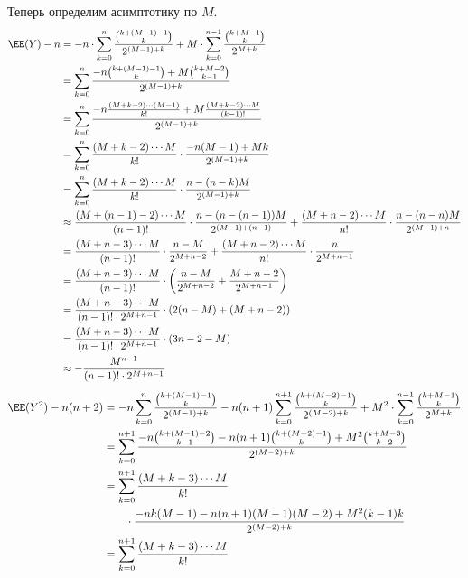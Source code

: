 \documentclass[12pt,a4paper]{article}
\begin{document}
\begin{enumproblem}
        Теперь определим асимптотику по $M$.
        \begin{align*}
            \EE(Y) - n
            &= -n \cdot \sum_{k=0}^{n} \frac{\binom{k+(M-1)-1}{k}}{2^{(M-1)+k}} + M \cdot \sum_{k=0}^{n-1} \frac{\binom{k+M-1}{k}}{2^{M+k}}\\
            &= \sum_{k=0}^{n} \frac{-n \binom{k+(M-1)-1}{k} + M \binom{k+M-2}{k-1}}{2^{(M-1)+k}}\\
            &= \sum_{k=0}^{n} \frac{-n \frac{(M+k-2) \cdots (M-1)}{k!} + M \frac{(M+k-2) \cdots M}{(k-1)!}}{2^{(M-1)+k}}\\
            &= \sum_{k=0}^{n} \frac{(M+k-2) \cdots M}{k!} \cdot \frac{-n(M-1) + M k}{2^{(M-1)+k}}\\
            &= \sum_{k=0}^{n} \frac{(M+k-2) \cdots M}{k!} \cdot \frac{n - (n-k)M}{2^{(M-1)+k}}\\
            &\approx \frac{(M+(n-1)-2) \cdots M}{(n-1)!} \cdot \frac{n - (n-(n-1))M}{2^{(M-1)+(n-1)}} + \frac{(M+n-2) \cdots M}{n!} \cdot \frac{n - (n-n)M}{2^{(M-1)+n}}\\
            &= \frac{(M+n-3) \cdots M}{(n-1)!} \cdot \frac{n - M}{2^{M+n-2}} + \frac{(M+n-2) \cdots M}{n!} \cdot \frac{n}{2^{M+n-1}}\\
            &= \frac{(M+n-3) \cdots M}{(n-1)!} \cdot \left(\frac{n - M}{2^{M+n-2}} + \frac{M+n-2}{2^{M+n-1}}\right)\\
            &= \frac{(M+n-3) \cdots M}{(n-1)! \cdot 2^{M+n-1}} \cdot \left(2(n - M) + (M+n-2)\right)\\
            &= \frac{(M+n-3) \cdots M}{(n-1)! \cdot 2^{M+n-1}} \cdot (3n - 2 - M)\\
            &\approx -\frac{M^{n-1}}{(n-1)! \cdot 2^{M+n-1}}
        \end{align*}
        \begin{align*}
            \EE(Y^2) - n(n+2)
            &= -n \sum_{k=0}^{n} \frac{\binom{k+(M-1)-1}{k}}{2^{(M-1)+k}} -n(n+1) \sum_{k=0}^{n+1} \frac{\binom{k+(M-2)-1}{k}}{2^{(M-2)+k}} + M^2 \cdot \sum_{k=0}^{n-1} \frac{\binom{k+M-1}{k}}{2^{M+k}}\\
            &= \sum_{k=0}^{n+1} \frac{-n \binom{k+(M-1)-2}{k-1} - n(n+1) \binom{k+(M-2)-1}{k} + M^2 \binom{k+M-3}{k-2}}{2^{(M-2)+k}}\\
            &= \sum_{k=0}^{n+1} \frac{(M+k-3) \cdots M}{k!}\\
            &\qquad \cdot \frac{-nk (M-1) - n(n+1) (M-1)(M-2) + M^2 (k-1)k}{2^{(M-2)+k}}\\
            &= \sum_{k=0}^{n+1} \frac{(M+k-3) \cdots M}{k!}\\

\end{align*}
\end{enumproblem}
\end{document}
